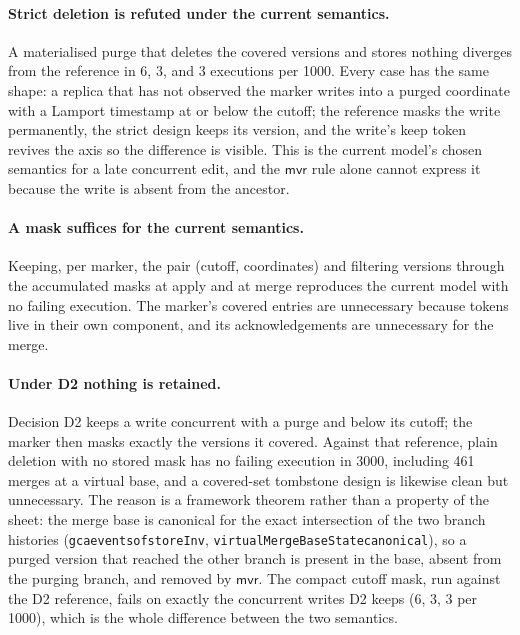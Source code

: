 \documentclass[11pt]{article}
\newcommand{\lean}[1]{\texttt{\def\_{\textunderscore\allowbreak}#1}}
\newcommand{\mvr}{\mathsf{mvr}}
\begin{document}
\paragraph{Strict deletion is refuted under the current semantics.} A materialised purge that deletes
the covered versions and stores nothing diverges from the reference in $6$,
$3$, and $3$ executions per 1000. Every case has the same shape: a replica
that has not observed the marker writes into a purged coordinate with a
Lamport timestamp at or below the cutoff; the reference masks the write
permanently, the strict design keeps its version, and the write's keep token
revives the axis so the difference is visible. This is the current model's
chosen semantics for a late concurrent edit, and the $\mvr$ rule alone
cannot express it because the write is absent from the ancestor.

\paragraph{A mask suffices for the current semantics.} Keeping, per marker,
the pair (cutoff, coordinates) and filtering versions through the accumulated
masks at apply and at merge reproduces the current model with no failing
execution. The marker's covered entries are unnecessary because tokens live
in their own component, and its acknowledgements are unnecessary for the
merge.

\paragraph{Under D2 nothing is retained.} Decision D2 keeps a write
concurrent with a purge and below its cutoff; the marker then masks exactly
the versions it covered. Against that reference, plain deletion with no
stored mask has no failing execution in 3000, including 461 merges at a
virtual base, and a covered-set tombstone design is likewise clean but
unnecessary. The reason is a framework theorem rather than a property of the
sheet: the merge base is canonical for the exact intersection of the two
branch histories (\lean{gca\_events\_of\_storeInv},
\lean{virtualMergeBaseState\_canonical}), so a purged version that reached
the other branch is present in the base, absent from the purging branch, and
removed by $\mvr$. The compact cutoff mask, run against the D2 reference,
fails on exactly the concurrent writes D2 keeps ($6$, $3$, $3$ per 1000),
which is the whole difference between the two semantics.
\end{document}
